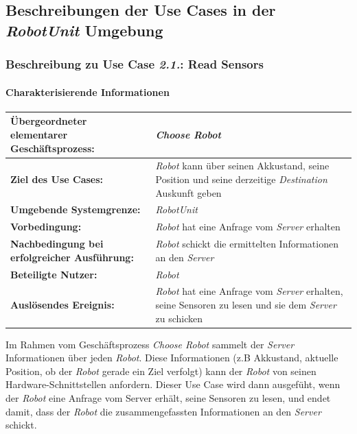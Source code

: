				\pagebreak
		\subsection{Beschreibungen der Use Cases in der \emph{RobotUnit} Umgebung}
			\subsubsection{Beschreibung zu Use Case \emph{2.1.}: Read Sensors}

				\paragraph*{Charakterisierende Informationen}

				\begin{table}[H]
					\centering
					\begin{tabularx}{\textwidth}{|p{5cm}|X|}
						\hline
						\textbf{Übergeordneter elementarer Geschäftsprozess:} & \emph{Choose Robot} \\ \hline
						\textbf{Ziel des Use Cases:} & \emph{Robot} kann über seinen Akkustand, seine Position und seine derzeitige \emph{Destination} Auskunft geben\\ \hline
						\textbf{Umgebende Systemgrenze:} & \emph{RobotUnit} \\ \hline
						\textbf{Vorbedingung:} & \emph{Robot} hat eine Anfrage vom \emph{Server} erhalten \\ \hline
						\textbf{Nachbedingung bei erfolgreicher Ausführung:} & \emph{Robot} schickt die ermittelten Informationen an den \emph{Server} \\ \hline
						\textbf{Beteiligte Nutzer:} & \emph{Robot} \\ \hline
						\textbf{Auslösendes Ereignis:} & \emph{Robot} hat eine Anfrage vom \emph{Server} erhalten, seine Sensoren zu lesen und sie dem \emph{Server} zu schicken \\
						\hline
					\end{tabularx}
				\end{table}

				Im Rahmen vom Geschäftsprozess \emph{Choose Robot} sammelt der \emph{Server}
				Informationen über jeden \emph{Robot}. Diese Informationen (z.B
				Akkustand, aktuelle Position, ob der \emph{Robot} gerade ein Ziel verfolgt)
				kann der \emph{Robot} von seinen Hardware-Schnittstellen anfordern. Dieser
				Use Case wird dann ausgefüht, wenn der \emph{Robot} eine Anfrage vom
				Server erhält, seine Sensoren zu lesen, und endet damit, dass der \emph{Robot}
				die zusammengefassten Informationen an den \emph{Server} schickt.

